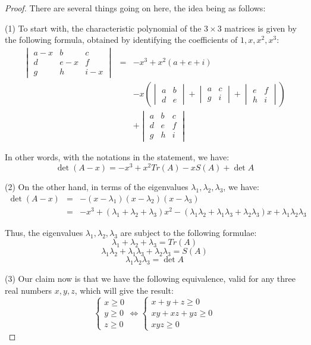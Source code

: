 \documentclass[12pt]{amsbook}
\begin{document}
\begin{proof}
There are several things going on here, the idea being as follows:

\medskip

(1) To start with, the characteristic polynomial of the $3\times3$ matrices is given by the following formula, obtained by identifying the coefficients of $1,x,x^2,x^3$:
\begin{eqnarray*}
\begin{vmatrix}
a-x&b&c\\ d&e-x&f\\ g&h&i-x\end{vmatrix}
&=&-x^3+x^2(a+e+i)\\
&&-x\left(\begin{vmatrix}a&b\\ d&e\end{vmatrix}
+\begin{vmatrix}a&c\\ g&i\end{vmatrix}
+\begin{vmatrix}e&f\\ h&i\end{vmatrix}\right)\\
&&+\begin{vmatrix}
a&b&c\\ d&e&f\\ g&h&i\end{vmatrix}
\end{eqnarray*}

In other words, with the notations in the statement, we have:
$$\det(A-x)=-x^3+x^2Tr(A)-xS(A)+\det A$$

(2) On the other hand, in terms of the eigenvalues $\lambda_1,\lambda_2,\lambda_3$, we have:
\begin{eqnarray*}
\det(A-x)
&=&-(x-\lambda_1)(x-\lambda_2)(x-\lambda_3)\\
&=&-x^3+(\lambda_1+\lambda_2+\lambda_3)x^2-(\lambda_1\lambda_2+\lambda_1\lambda_3+\lambda_2\lambda_3)x+\lambda_1\lambda_2\lambda_3
\end{eqnarray*}

Thus, the eigenvalues $\lambda_1,\lambda_2,\lambda_3$ are subject to the following formulae:
$$\lambda_1+\lambda_2+\lambda_3=Tr(A)$$
$$\lambda_1\lambda_2+\lambda_1\lambda_3+\lambda_2\lambda_3=S(A)$$
$$\lambda_1\lambda_2\lambda_3=\det A$$

(3) Our claim now is that we have the following equivalence, valid for any three real numbers $x,y,z$, which will give the result:
$$\begin{cases}x\geq0\\ y\geq0\\ z\geq0\end{cases}\iff
\begin{cases}x+y+z\geq0\\ xy+xz+yz\geq0\\ xyz\geq0\end{cases}$$


\end{proof}
\end{document}
